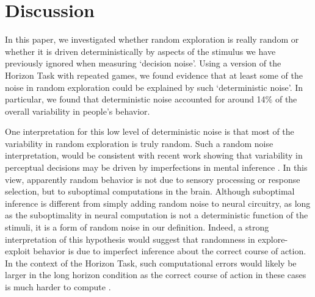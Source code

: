 \documentclass[12pt]{article}
\begin{document}
{\section*{Discussion}
In this paper, we investigated whether random exploration is really random or whether it is driven deterministically by aspects of the stimulus we have previously ignored when measuring `decision noise'.  Using a version of the Horizon Task with repeated games, we found evidence that at least some of the noise in random exploration could be explained by such `deterministic noise'. In particular, we found that deterministic noise accounted for around 14\% of the overall variability in people's behavior. 


One interpretation for this low level of deterministic noise is that most of the variability in random exploration is truly random. Such a random noise interpretation, would be consistent with recent work showing that variability in perceptual decisions may be driven by imperfections in mental inference \citep{drugowitsch16}. In this view, apparently random behavior is not due to sensory processing or response selection, but to suboptimal computations in the brain. Although suboptimal inference is different from simply adding random noise to neural circuitry\citep{Pouget12}, as long as the suboptimality in neural computation is not a deterministic function of the stimuli, it is a form of random noise in our definition. Indeed, a strong interpretation of this hypothesis would suggest that randomness in explore-exploit behavior is due to imperfect inference about the correct course of action. In the context of the Horizon Task, such computational errors would likely be larger in the long horizon condition as the correct course of action in these cases is much harder to compute \citep{Wilson2020}.

}
\end{document}
